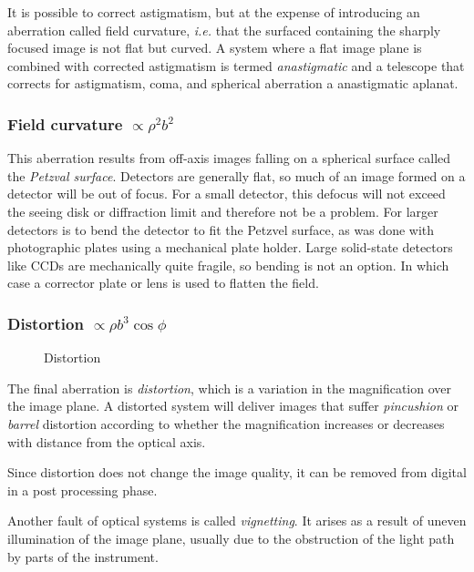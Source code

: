 \documentclass{article}
\begin{document}
It is possible to correct astigmatism, but at the expense of introducing
an aberration called field curvature, {\it i.e.} that the surfaced containing
the sharply focused image is not flat but curved. A system where a flat 
image plane is combined with corrected astigmatism is termed {\it anastigmatic}
and a telescope that corrects for astigmatism, coma, and spherical aberration a
anastigmatic aplanat. 

\subsubsection{Field curvature $\propto\rho^2 b^2$}

This aberration results from off-axis images falling on a spherical surface called the
{\it Petzval surface}. Detectors are generally flat, so much of an image formed on a 
detector will be out of focus. For a small detector, this defocus will not exceed the 
seeing disk or diffraction limit and therefore not be a problem. For larger detectors
is to bend the detector to fit the Petzvel surface, as was done with photographic plates
using a mechanical plate holder. Large solid-state detectors like CCDs are mechanically 
quite fragile, so bending is not an option. In which case a corrector plate or lens is
used to flatten the field.

\subsubsection{Distortion $\propto \rho b^3\cos\phi$}

\begin{figure}[th!]
  \hfil{}\hfil
  \caption{Distortion}
  \label{fig:aberration-distortion}
\end{figure}

The final aberration is {\it distortion}, which is a variation in the 
magnification over the image plane. A distorted system will deliver images
that suffer {\it pincushion} or {\it barrel} distortion according to 
whether the magnification increases or decreases with distance from the 
optical axis.

Since distortion does not change the image quality, it can be removed from 
digital in a post processing phase.

Another fault of optical systems is called {\it vignetting}. It arises as a result
of uneven illumination of the image plane, usually due to the obstruction of 
the light path by parts of the instrument.
\end{document}
